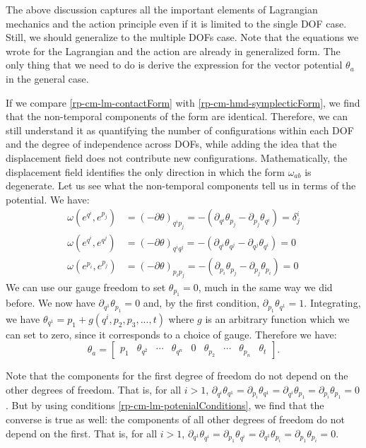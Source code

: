 The above discussion captures all the important elements of Lagrangian mechanics and the action principle even if it is limited to the single DOF case. Still, we should generalize to the multiple DOFs case. Note that the equations we wrote for the Lagrangian and the action are already in generalized form. The only thing that we need to do is derive the expression for the vector potential $\theta_a$ in the general case.

If we compare \ref{rp-cm-lm-contactForm} with \ref{rp-cm-hmd-symplecticForm}, we find that the non-temporal components of the form are identical. Therefore, we can still understand it as quantifying the number of configurations within each DOF and the degree of independence across DOFs, while adding the idea that the displacement field does not contribute new configurations. Mathematically, the displacement field identifies the only direction in which the form $\omega_{ab}$ is degenerate. Let us see what the non-temporal components tell us in terms of the potential. We have:
\begin{equation}\label{rp-cm-lm-potenialConditions}
	\begin{aligned}
		\omega(e^{q^i}, e^{p_j}) &= (-\partial\theta)_{q^i p_j} = -(\partial_{q^i}\theta_{p_j} - \partial_{p_j}\theta_{q^i}) = \delta^i_j \\
		\omega(e^{q^i}, e^{q^j}) &= (-\partial\theta)_{q^i q^j} = -(\partial_{q^i}\theta_{q^j} - \partial_{q^j}\theta_{q^i}) = 0 \\
		\omega(e^{p_i}, e^{p_j}) &= (-\partial\theta)_{p_i p_j} = -(\partial_{p_i}\theta_{p_j} - \partial_{p_j}\theta_{p_i}) = 0
	\end{aligned}
\end{equation}
We can use our gauge freedom to set $\theta_{p_1} = 0$, much in the same way we did before. We now have $\partial_{q^1} \theta_{p_1} = 0$ and, by the first condition, $\partial_{p_1} \theta_{q^1} = 1$. Integrating, we have $\theta_{q^1} = p_1 + g(q^i, p_2, p_3, ..., t)$ where $g$ is an arbitrary function which we can set to zero, since it corresponds to a choice of gauge. Therefore we have:
\begin{equation}
	\theta_a =  \begin{bmatrix}
		p_1 & \theta_{q^2} & \cdots & \theta_{q^n} & 0 & \theta_{p_2} & \cdots & \theta_{p_n} & \theta_{t}
	\end{bmatrix}. 
\end{equation}

Note that the components for the first degree of freedom do not depend on the other degrees of freedom. That is, for all $i>1$, $\partial_{q^i} \theta_{q^1} = \partial_{p_i} \theta_{q^1} = \partial_{q^i} \theta_{p_1} = \partial_{p_i} \theta_{p_1} = 0$. But by using conditions \ref{rp-cm-lm-potenialConditions}, we find that the converse is true as well: the components of all other degrees of freedom do not depend on the first. That is, for all $i>1$, $\partial_{q^1} \theta_{q^i} = \partial_{p_1} \theta_{q^i} = \partial_{q^1} \theta_{p_i} = \partial_{p_1} \theta_{p_i} = 0$.

